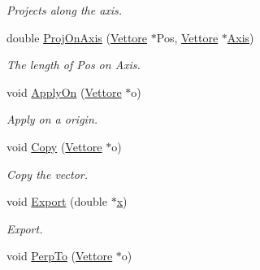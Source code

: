 \begin{DoxyCompactItemize}
\begin{DoxyCompactList}\small\item\em \-Projects along the axis. \end{DoxyCompactList}\item 
\hypertarget{classVettore_a0521c48c381d2ddd16d4039c4d64a87b}{double \hyperlink{classVettore_a0521c48c381d2ddd16d4039c4d64a87b}{\-Proj\-On\-Axis} (\hyperlink{classVettore}{\-Vettore} $\ast$\-Pos, \hyperlink{classVettore}{\-Vettore} $\ast$\hyperlink{classVettore_a5a767accac3ff301f062fce739190bb8}{\-Axis})}\label{classVettore_a0521c48c381d2ddd16d4039c4d64a87b}

\begin{DoxyCompactList}\small\item\em \-The length of \-Pos on \-Axis. \end{DoxyCompactList}\item 
\hypertarget{classVettore_af4b317359ca70bbe6f41a178046d2e7f}{void \hyperlink{classVettore_af4b317359ca70bbe6f41a178046d2e7f}{\-Apply\-On} (\hyperlink{classVettore}{\-Vettore} $\ast$o)}\label{classVettore_af4b317359ca70bbe6f41a178046d2e7f}

\begin{DoxyCompactList}\small\item\em \-Apply on a origin. \end{DoxyCompactList}\item 
\hypertarget{classVettore_aed4e73920eb1f5d4d407c9913dd314f4}{void \hyperlink{classVettore_aed4e73920eb1f5d4d407c9913dd314f4}{\-Copy} (\hyperlink{classVettore}{\-Vettore} $\ast$o)}\label{classVettore_aed4e73920eb1f5d4d407c9913dd314f4}

\begin{DoxyCompactList}\small\item\em \-Copy the vector. \end{DoxyCompactList}\item 
\hypertarget{classVettore_a05beac72f2373cd7d3caa4ad8d3823be}{void \hyperlink{classVettore_a05beac72f2373cd7d3caa4ad8d3823be}{\-Export} (double $\ast$\hyperlink{classVettore_a711aad4cbe735871dd9e91ab575c878b}{x})}\label{classVettore_a05beac72f2373cd7d3caa4ad8d3823be}

\begin{DoxyCompactList}\small\item\em \-Export. \end{DoxyCompactList}\item 
\hypertarget{classVettore_ad289412e19e3a03ef86d329311712cff}{void \hyperlink{classVettore_ad289412e19e3a03ef86d329311712cff}{\-Perp\-To} (\hyperlink{classVettore}{\-Vettore} $\ast$o)}\label{classVettore_ad289412e19e3a03ef86d329311712cff}


\end{DoxyCompactItemize}
